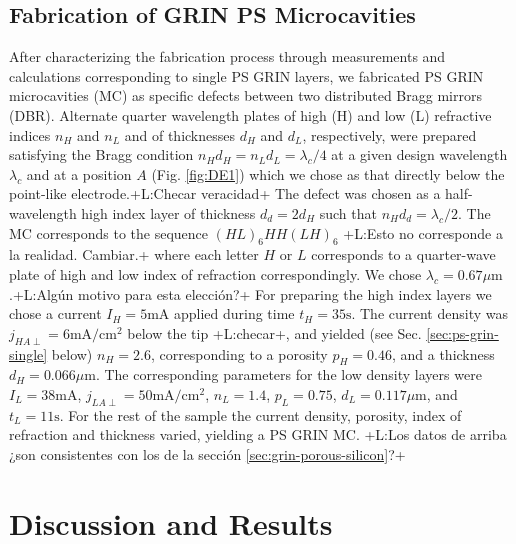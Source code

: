 \documentclass{article}
\newcommand{\notaL}[1]{{\color{blue}+L:#1+}}
\begin{document}
\subsection{Fabrication  of GRIN PS Microcavities}
\label{sec:fabrication-grin-ps}
After characterizing the fabrication process through measurements and
calculations corresponding to single PS GRIN layers, we
fabricated PS GRIN microcavities (MC) as specific defects between two distributed Bragg
mirrors  (DBR). Alternate quarter wavelength plates of high (H) and low (L)
refractive indices $n_H$ and $n_L$ and of thicknesses $d_H$ and $d_L$,
respectively, were prepared satisfying the Bragg condition
$n_Hd_H=n_Ld_L=\lambda_c/4$ at a given design
wavelength $\lambda_c$ and at a position $A$ (Fig. \ref{fig:DE1}) which
we chose as that directly below the point-like electrode.\notaL{Checar
  veracidad} The defect
was chosen as a half-wavelength high index layer of thickness $d_d=2d_H$ such that
$n_Hd_d=\lambda_c/2$. The MC corresponds to the
sequence $(HL)_6HH(LH )_6$ \notaL{Esto no corresponde a la
  realidad. Cambiar.} where each letter $H$ or $L$ corresponds to
a quarter-wave plate of high and low index of refraction correspondingly.
We chose $\lambda_c= 0.67 \mu\text{m}$.\notaL{Algún motivo para esta
  elección?} For preparing the high index layers we
chose a current $I_H=5\text{mA}$ applied during  time
$t_H=35 \text{s}$. The current density was
$j_{HA\perp}= 6\text{mA}/\text{cm}^2$ below the tip \notaL{checar},
and yielded (see Sec. \ref{sec:ps-grin-single} below)
$n_H =2.6$, corresponding to a porosity $p_H =0.46$, and a
thickness $d_H=0.066 \mu\text{m}$. The corresponding parameters for the low density
layers were $I_L=38\text{mA}$, $j_{LA\perp}=50\text{mA}/\text{cm}^2$, $n_L= 1.4$,  $p_L =0.75$,
$d_L=0.117 \mu \text{m}$, and $t_L=11 \text{s}$. For the rest of the
sample the current density, porosity, index of refraction and thickness
varied, yielding a PS GRIN MC. \notaL{Los datos de arriba ¿son
  consistentes con los de la sección \ref{sec:grin-porous-silicon}?}

\section{Discussion and Results}
\label{sec:discussion-results}
\end{document}
